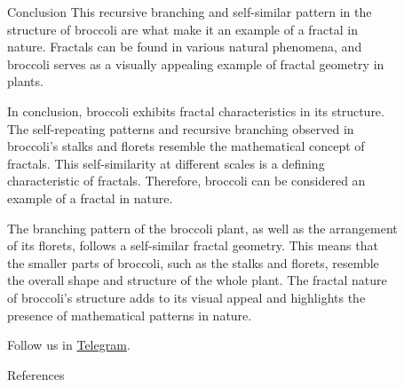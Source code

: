 \documentclass[]{beamer}
\begin{document}
\begin{frame}[t]
\begin{columns}[t]
\begin{column}{\twocolwid}
    \end{column} %
    
    \begin{column}{\sepwid}\end{column} %
    
    \begin{column}{\onecolwid} %
    
    
    \begin{block}{Conclusion}
    This recursive branching and self-similar pattern in the structure of broccoli are what make it an example of a fractal in nature. Fractals can be found in various natural phenomena, and broccoli serves as a visually appealing example of fractal geometry in plants.

    In conclusion, broccoli exhibits fractal characteristics in its structure. The self-repeating patterns and recursive branching observed in broccoli's stalks and florets resemble the mathematical concept of fractals. This self-similarity at different scales is a defining characteristic of fractals. Therefore, broccoli can be considered an example of a fractal in nature.
    
    The branching pattern of the broccoli plant, as well as the arrangement of its florets, follows a self-similar fractal geometry. This means that the smaller parts of broccoli, such as the stalks and florets, resemble the overall shape and structure of the whole plant. The fractal nature of broccoli's structure adds to its visual appeal and highlights the presence of mathematical patterns in nature.
    
    Follow us in \href{https://t.me/vega_institute}{Telegram}.
    
    \end{block}
    
    
    \begin{block}{References}
    
    \printbibliography \vspace{0.75in}
    
    \end{block}
    
    \end{column} %
    
    \begin{column}{\lrmargin}\end{column} %
    
    \end{columns} %
    \end{frame} %
\end{document}

